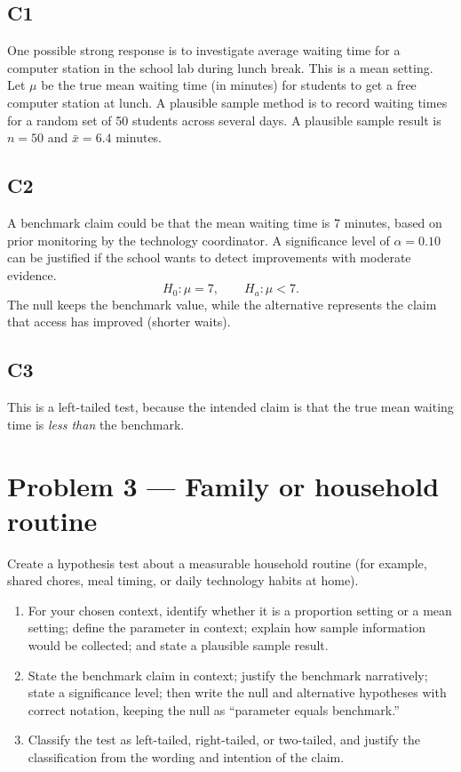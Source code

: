 	\subsection*{C1}
	One possible strong response is to investigate average waiting time for a computer station in the school lab during lunch break. This is a mean setting. Let \(\mu\) be the true mean waiting time (in minutes) for students to get a free computer station at lunch. A plausible sample method is to record waiting times for a random set of 50 students across several days. A plausible sample result is \(n=50\) and \(\bar{x}=6.4\) minutes.
	
	\subsection*{C2}
	A benchmark claim could be that the mean waiting time is 7 minutes, based on prior monitoring by the technology coordinator. A significance level of \(\alpha=0.10\) can be justified if the school wants to detect improvements with moderate evidence.
	\[
	H_0\colon \mu=7, \qquad H_a\colon \mu<7.
	\]
	The null keeps the benchmark value, while the alternative represents the claim that access has improved (shorter waits).
	
	\subsection*{C3}
	This is a left-tailed test, because the intended claim is that the true mean waiting time is \emph{less than} the benchmark.


	\section{Problem 3 --- Family or household routine}
	Create a hypothesis test about a measurable household routine (for example, shared chores, meal timing, or daily technology habits at home).
	
	\begin{enumerate}
		\item[(C1)] For your chosen context, identify whether it is a proportion setting or a mean setting; define the parameter in context; explain how sample information would be collected; and state a plausible sample result.
		\item[(C2)] State the benchmark claim in context; justify the benchmark narratively; state a significance level; then write the null and alternative hypotheses with correct notation, keeping the null as ``parameter equals benchmark.''
		\item[(C3)] Classify the test as left-tailed, right-tailed, or two-tailed, and justify the classification from the wording and intention of the claim.
	\end{enumerate}
	
